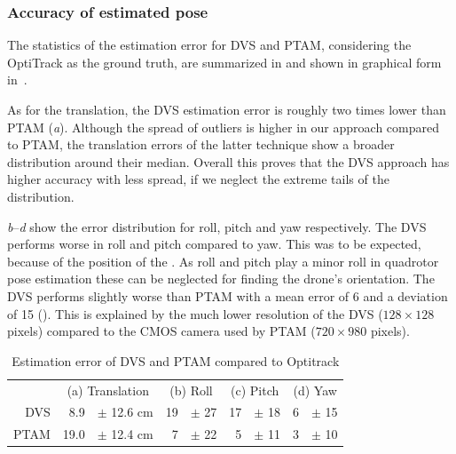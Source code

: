 \subsubsection{Accuracy of estimated pose\label{sec:poseestimationeval}}

The statistics of the estimation error for DVS and PTAM, considering
the OptiTrack as the ground truth, are summarized in 
and shown in graphical form in~.

As for the translation, the DVS estimation error is roughly two times
lower than PTAM (\emph{a}). Although the spread
of outliers is higher in our approach compared to PTAM, the translation
errors of the latter technique show a broader distribution around
their median. Overall this proves that the DVS approach has higher
accuracy with less spread, if we neglect the extreme tails of the
distribution.

\emph{b}--\emph{d} show the error distribution
for roll, pitch and yaw respectively. The DVS performs worse in roll
and pitch compared to yaw. This was to be expected, because of the
position of the \ALMs. As roll and pitch play a minor roll in quadrotor
pose estimation these can be neglected for finding the drone's orientation.
The DVS performs slightly worse than PTAM with a mean error of 6\textdegree{}
and a deviation of 15\textdegree{} ().
This is explained by the much lower resolution of the DVS ($128\times128$
pixels) compared to the CMOS camera used by PTAM ($720\times980$
pixels). 

\begin{table}
\caption{\label{tab:Estimation-error}Estimation error of DVS and PTAM compared
to Optitrack}


\centering

\newcommand{\tmean}{mean\xspace}
\newcommand{\incm}{[cm]}
\newcommand{\indeg}{[$^\circ$]}
\newcommand{\tstd}{std.dev.\xspace}
\renewcommand{\tabcolsep}{3pt}
\footnotesize

\begin{tabular}{r|rl|rl|rl|rl}
\multicolumn{1}{r}{} & \multicolumn{2}{c}{(a) Translation} & \multicolumn{2}{c}{(b) Roll } & \multicolumn{2}{c}{(c) Pitch} & \multicolumn{2}{c}{(d) Yaw}\tabularnewline
\cline{2-9} 
DVS\rule{0pt}{1em} & 8.9  & $\pm$ 12.6 cm  & 19  & $\pm$ 27\textdegree{} & 17  & $\pm$ 18\textdegree{}  & 6  & $\pm$ 15\textdegree{}\tabularnewline
PTAM & 19.0 & $\pm$ 12.4 cm & 7  & $\pm$ 22\textdegree{} & 5  & $\pm$ 11\textdegree{}  & 3  & $\pm$ 10\textdegree{}\tabularnewline
\end{tabular}

\end{table}


